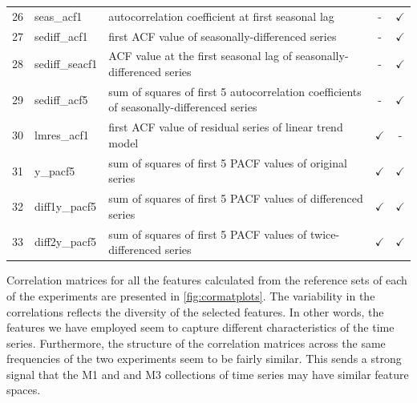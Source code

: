 \documentclass[11pt,a4paper,]{article}
\def\yes{$\checkmark$}
\theoremstyle{definition}
\theoremstyle{definition}
\theoremstyle{definition}
\theoremstyle{remark}
\begin{document}
\begin{table}[!htp]
\begin{tabular}{llp{}cc}
26 & seas\_acf1     & autocorrelation coefficient at first seasonal lag                                                & -     & \yes \\
27 & sediff\_acf1   & first ACF value of seasonally-differenced series                                        & -     & \yes\\
28 & sediff\_seacf1 & ACF value at the first seasonal lag of seasonally-differenced series                    & -     & \yes \\
29 & sediff\_acf5   & sum of squares of first 5 autocorrelation coefficients of seasonally-differenced series & -     & \yes \\
30 & lmres\_acf1    & first ACF value of residual series of linear trend model                                & \yes  & - \\
31 & y\_pacf5       & sum of squares of first 5 PACF values of original series                                & \yes  & \yes \\
32 & diff1y\_pacf5  & sum of squares of first 5 PACF values of differenced series                             & \yes  & \yes \\
33 & diff2y\_pacf5  & sum of squares of first 5 PACF values of twice-differenced series                       & \yes  & \yes \\
\bottomrule
 \end{tabular}
\end{table}

Correlation matrices for all the features calculated from the reference
sets of each of the experiments are presented in
\autoref{fig:cormatplots}. The variability in the correlations reflects
the diversity of the selected features. In other words, the features we
have employed seem to capture different characteristics of the time
series. Furthermore, the structure of the correlation matrices across
the same frequencies of the two experiments seem to be fairly similar.
This sends a strong signal that the M1 and and M3 collections of time
series may have similar feature spaces.
\end{document}
